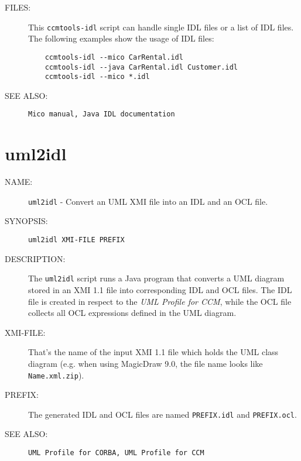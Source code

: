 \begin{description}
\item [FILES:]
  This {\tt ccmtools-idl} script can handle single IDL files or a list of IDL
  files. The following examples show the usage of IDL files: 
  \begin{verbatim}
    ccmtools-idl --mico CarRental.idl
    ccmtools-idl --java CarRental.idl Customer.idl
    ccmtools-idl --mico *.idl
  \end{verbatim}

\item [SEE ALSO:]
  {\tt Mico manual, Java IDL documentation}
\end{description}


\section{uml2idl}

\begin{description}

\item [NAME:] 
  {\tt uml2idl} - Convert an UML XMI file into an IDL and an OCL file. 

\item [SYNOPSIS:] 
  {\tt uml2idl XMI-FILE PREFIX}

\item [DESCRIPTION:]
  The {\tt uml2idl} script runs a Java program that converts a UML diagram stored
  in an XMI 1.1 file into corresponding IDL and OCL files.
  The IDL file is created in respect to the {\it UML Profile for CCM}, while the
  OCL file collects all OCL expressions defined in the UML diagram.

\item [XMI-FILE:]
  That's the name of the input XMI 1.1 file which holds the UML class diagram
  (e.g. when using MagicDraw 9.0, the file name looks like {\tt Name.xml.zip}).

\item [PREFIX:]
  The generated IDL and OCL files are named {\tt PREFIX.idl} and {\tt PREFIX.ocl}.

\item [SEE ALSO:]
  {\tt UML Profile for CORBA, UML Profile for CCM}
  
\end{description}
